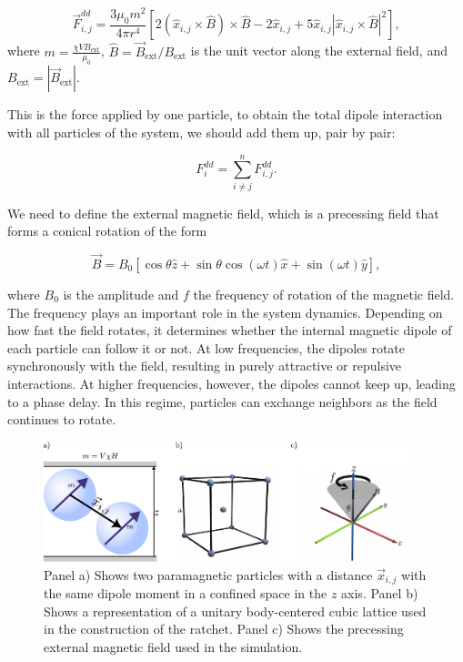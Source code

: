 \begin{equation}
  \label{eq:dipoledipoleforce_Bext}
  \vec{F}^{dd}_{i,j} = \frac{3\mu_0 m^2}{4\pi r^4}
\left[ 2(\hat{x}_{i,j} \times \hat{B}) \times \hat{B} - 2\hat{x}_{i,j} + 5\hat{x}_{i,j}|\hat{x}_{i,j} \times \hat{B}|^2 \right],
\end{equation}
where $m = \frac{\chi V B_{\text{ext}}}{\mu_0}$, $\hat{B} = \vec{B}_{\text{ext}}/B_{\text{ext}}$ is the unit vector along the external field, and $B_{\text{ext}} = |\vec{B}_{\text{ext}}|$. 

This is the force applied by one particle, to obtain the total dipole interaction with all particles of the system, we should add them up, pair by pair:

\begin{equation}
  F^{dd}_i = \sum^{n}_{i \neq j} F^{dd}_{i,j}.  
  \label{eq:dipolesum}
\end{equation}

We need to define the external magnetic field, which is a precessing field that forms a conical rotation of the form

\begin{equation}
  \vec{B} = B_0 [\cos{\theta}\hat{z} + \sin{\theta}\cos{(\omega t)}\hat{x} + \sin{(\omega t)}\hat{y}],
  \label{eq:magneticfield}
\end{equation}


where $B_0$ is the amplitude and $f$ the frequency of rotation of the magnetic field. The frequency plays an important role in the system dynamics. Depending on how fast the field rotates, it determines whether the internal magnetic dipole of each particle can follow it or not. At low frequencies, the dipoles rotate synchronously with the field, resulting in purely attractive or repulsive interactions. At higher frequencies, however, the dipoles cannot keep up, leading to a phase delay. In this regime, particles can exchange neighbors as the field continues to rotate.


\begin{figure}[H]
  \begin{center}
    \includegraphics[width=0.95\textwidth]{figures/methods1.pdf}
  \end{center}
  \caption[Representation of the paramagnetic colloids, body-centered-cubic lattice used for the ratchet, and the precessing conic magnetic field.]{Panel a) Shows two paramagnetic particles with a distance \(\vec{x}_{i,j}\) with the same dipole moment in a confined space in the \( z\) axis. Panel b) Shows a representation of a  unitary body-centered cubic lattice used in the construction of the ratchet. Panel c) Shows the precessing external magnetic field used in the simulation.}\label{fig:facecenteredlattice}
\end{figure}

